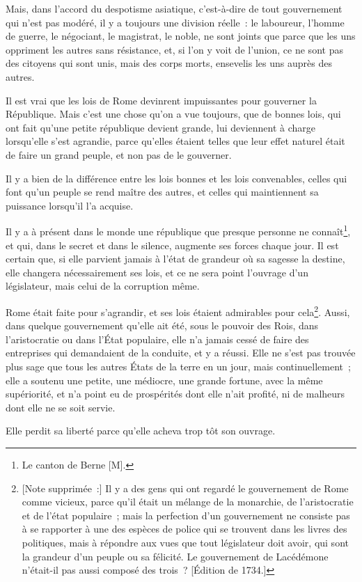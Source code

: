 \documentclass[french,twoside]{book} %
\newcommand\chapterclose{} %
\begin{document}
Mais, dans l’accord du despotisme asiatique, c’est-à-dire de tout gouvernement qui n’est pas modéré, il y a toujours une division réelle : le laboureur, l’homme de guerre, le négociant, le magistrat, le noble, ne sont joints que parce que les uns oppriment les autres sans résistance, et, si l’on y voit de l’union, ce ne sont pas des citoyens qui sont unis, mais des corps morts, ensevelis les uns auprès des autres.\par
Il est vrai que les lois de Rome devinrent impuissantes pour gouverner la République. Mais c’est une chose qu’on a vue toujours, que de bonnes lois, qui ont fait qu’une petite république devient grande, lui deviennent à charge lorsqu’elle s’est agrandie, parce qu’elles étaient telles que leur effet naturel était de faire un grand peuple, et non pas de le gouverner.\par
Il y a bien de la différence entre les lois bonnes et les lois convenables, celles qui font qu’un peuple se rend maître des autres, et celles qui maintiennent sa puissance lorsqu’il l’a acquise.\par
Il y a à présent dans le monde une république que presque personne ne connaît\footnote{Le canton de Berne [M].}, et qui, dans le secret et dans le silence, augmente ses forces chaque jour. Il est certain que, si elle parvient jamais à l’état de grandeur où sa sagesse la destine, elle changera nécessairement ses lois, et ce ne sera point l’ouvrage d’un législateur, mais celui de la corruption même.\par
Rome était faite pour s’agrandir, et ses lois étaient admirables pour cela\footnote{[Note supprimée :] Il y a des gens qui ont regardé le gouvernement de Rome comme vicieux, parce qu’il était un mélange de la monarchie, de l’aristocratie et de l’état populaire ; mais la perfection d’un gouvernement ne consiste pas à se rapporter à une des espèces de police qui se trouvent dans les livres des politiques, mais à répondre aux vues que tout législateur doit avoir, qui sont la grandeur d’un peuple ou sa félicité. Le gouvernement de Lacédémone n’était-il pas aussi composé des trois ? [Édition de 1734.]}. Aussi, dans quelque gouvernement qu’elle ait été, sous le pouvoir des Rois, dans l’aristocratie ou dans l’État populaire, elle n’a jamais cessé de faire des entreprises qui demandaient de la conduite, et y a réussi. Elle ne s’est pas trouvée plus sage que tous les autres États de la terre en un jour, mais continuellement ; elle a soutenu une petite, une médiocre, une grande fortune, avec la même supériorité, et n’a point eu de prospérités dont elle n’ait profité, ni de malheurs dont elle ne se soit servie.\par
Elle perdit sa liberté parce qu’elle acheva trop tôt son ouvrage.
\chapterclose
\end{document}
